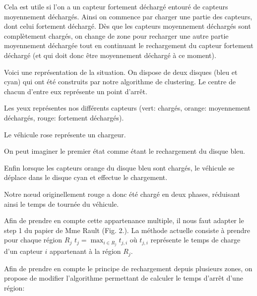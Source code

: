 \documentclass[noposter,final]{polytech/polytech}
\begin{document}
			Cela est utile si l'on a un capteur fortement déchargé entouré de capteurs moyennement déchargés.
			Ainsi on commence par charger une partie des capteurs, dont celui fortement déchargé.
			Dès que les capteurs moyennement déchargés sont complètement chargés, on change de zone pour recharger une autre partie moyennement déchargée tout en continuant le rechargement du capteur fortement déchargé (et qui doit donc être moyennement déchargé à ce moment).
			
			Voici une représentation de la situation.
			On dispose de deux disques (bleu et cyan) qui ont été construits par notre algorithme de clustering.
			Le centre de chacun d'entre eux représente un point d'arrêt.
			
			Les yeux représentes nos différents capteurs (vert: chargés, orange: moyennement déchargés, rouge: fortement déchargés).
			
			Le véhicule rose représente un chargeur.
			
			On peut imaginer le premier état comme étant le rechargement du disque bleu.
			
			
			Enfin lorsque les capteurs orange du disque bleu sont chargés, le véhicule se déplace dans le disque cyan et effectue le chargement.
			
			
			Notre n\oe ud originellement rouge a donc été chargé en deux phases, réduisant ainsi le temps de tournée du véhicule.
			
			Afin de prendre en compte cette appartenance multiple, il nous faut adapter le step 1 du papier de Mme Rault \cite{Rault:chargers} (Fig. 2.).
			La méthode actuelle consiste à prendre pour chaque région $R_j$ $t_j=\max_{i\in R_j}t_{j,i}$ où $t_{j,i}$ représente le temps de charge d'un capteur $i$ appartenant à la région $R_j$.
			
			Afin de prendre en compte le principe de rechargement depuis plusieurs zones, on propose de modifier l'algorithme permettant de calculer le temps d'arrêt d'une région:
			
\end{document}
